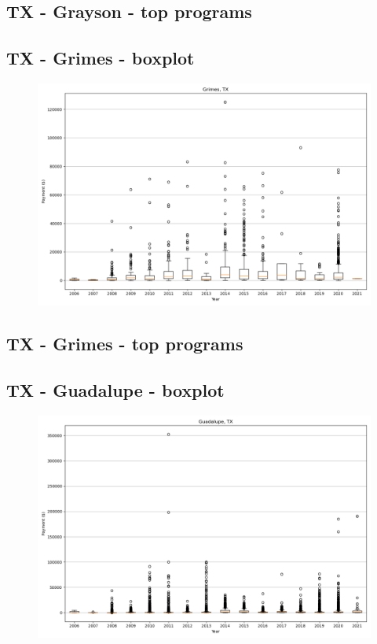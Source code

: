 \subsection*{TX - Grayson - top programs}

\newpage
\subsection*{TX - Grimes - boxplot}
\begin{figure}[h]
\centering
\includegraphics[width=7in]{../output/boxplots/counties/Grimes-TX_boxplot.png}
\end{figure}


\subsection*{TX - Grimes - top programs}

\newpage
\subsection*{TX - Guadalupe - boxplot}
\begin{figure}[h]
\centering
\includegraphics[width=7in]{../output/boxplots/counties/Guadalupe-TX_boxplot.png}
\end{figure}


